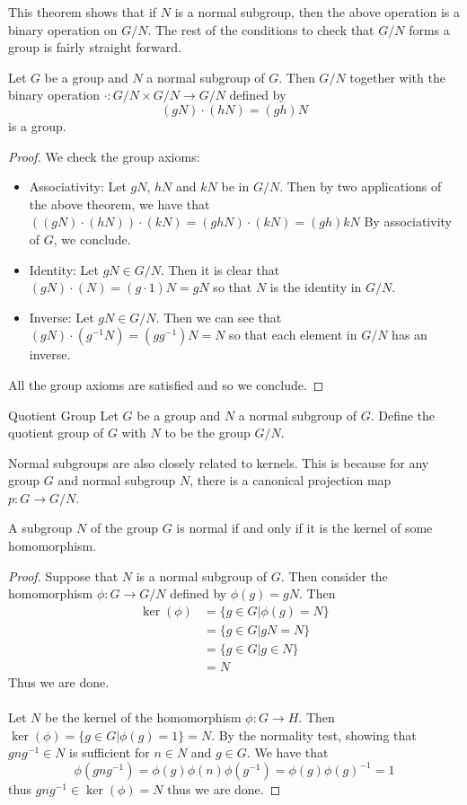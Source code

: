 \documentclass[a4paper]{article}
\begin{document}
This theorem shows that if $N$ is a normal subgroup, then the above operation is a binary operation on $G/N$. The rest of the conditions to check that $G/N$ forms a group is fairly straight forward. 

\begin{prp}{}{} Let $G$ be a group and $N$ a normal subgroup of $G$. Then $G/N$ together with the binary operation $\cdot:G/N\times G/N\to G/N$ defined by $$(gN)\cdot(hN)=(gh)N$$ is a group. \tcbline
\begin{proof}
We check the group axioms: 
\begin{itemize}
\item Associativity: Let $gN$, $hN$ and $kN$ be in $G/N$. Then by two applications of the above theorem, we have that $((gN)\cdot(hN))\cdot(kN)=(ghN)\cdot(kN)=(gh)kN$ By associativity of $G$, we conclude. 
\item Identity: Let $gN\in G/N$. Then it is clear that $(gN)\cdot(N)=(g\cdot 1)N=gN$ so that $N$ is the identity in $G/N$. 
\item Inverse: Let $gN\in G/N$. Then we can see that $(gN)\cdot(g^{-1}N)=(gg^{-1})N=N$ so that each element in $G/N$ has an inverse. 
\end{itemize}
All the group axioms are satisfied and so we conclude. 
\end{proof}
\end{prp}

\begin{defn}{Quotient Group}{} Let $G$ be a group and $N$ a normal subgroup of $G$. Define the quotient group of $G$ with $N$ to be the group $G/N$. 
\end{defn}

Normal subgroups are also closely related to kernels. This is because for any group $G$ and normal subgroup $N$, there is a canonical projection map $p:G\to G/N$. 

\begin{prp}{}{} A subgroup $N$ of the group $G$ is normal if and only if it is the kernel of some homomorphism. \tcbline
\begin{proof}
Suppose that $N$ is a normal subgroup of $G$. Then consider the homomorphism $\phi:G\to G/N$ defined by $\phi(g)=gN$. Then
\begin{align*}
\ker(\phi)&=\{g\in G|\phi(g)=N\}\\
&=\{g\in G|gN=N\}\\
&=\{g\in G|g\in N\}\\
&=N
\end{align*} Thus we are done. \\~\\

Let $N$ be the kernel of the homomorphism $\phi:G\to H$. Then $\ker(\phi)=\{g\in G|\phi(g)=1\}=N$. By the normality test, showing that $gng^{-1}\in N$ is sufficient for $n\in N$ and $g\in G$. We have that $$\phi(gng^{-1})=\phi(g)\phi(n)\phi(g^{-1})=\phi(g)\phi(g)^{-1}=1$$ thus $gng^{-1}\in\ker(\phi)=N$ thus we are done. 
\end{proof}
\end{prp}
\end{document}
